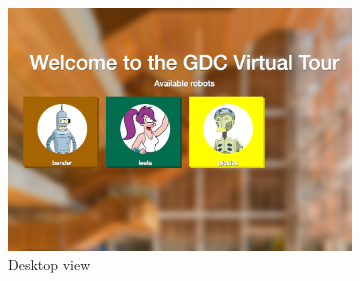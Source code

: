 \documentclass[
  oneside,
  11pt, a4paper,
  footinclude=true,
  headinclude=true,
  cleardoublepage=empty
]{article}
\begin{document}
\begin{figure}[!tbp]
  \begin{subfigure}[b]{0.63\textwidth}
    \includegraphics[width=\textwidth]{tour_homepage}
    \caption{Desktop view}
  \end{subfigure}
  \hfill
  \begin{subfigure}[b]{0.25\textwidth}

\end{subfigure}
\end{figure}
\end{document}
